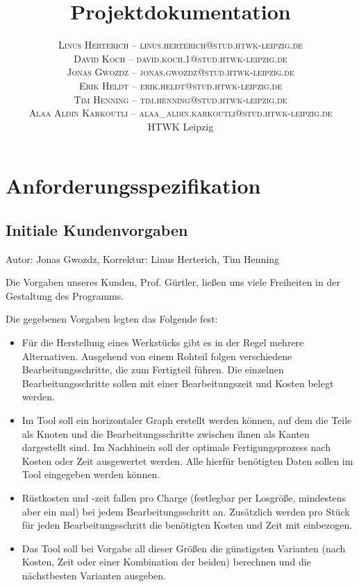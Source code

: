 \documentclass[twoside]{report}
\title{\vspace{-5mm}%
	\fontsize{24pt}{10pt}\selectfont
	\textbf{Projektdokumentation}
	}
\author{%
	\large
	\textsc{Linus Herterich -- linus.herterich@stud.htwk-leipzig.de} \\[2mm]
	\textsc{David Koch -- david.koch.1@stud.htwk-leipzig.de} \\[2mm]
	\textsc{Jonas Gwozdz -- jonas.gwozdz@stud.htwk-leipzig.de} \\[2mm]
  \textsc{Erik Heldt -- erik.heldt@stud.htwk-leipzig.de} \\[2mm]
  \textsc{Tim Henning -- tim.henning@stud.htwk-leipzig.de} \\[2mm]
	\textsc{Alaa Aldin Karkoutli -- alaa_aldin.karkoutli@stud.htwk-leipzig.de} \\[2mm]
	\normalsize	HTWK Leipzig 
	}
\date{}
\begin{document}

\maketitle
\thispagestyle{fancy}

\tableofcontents


\section{Anforderungsspezifikation}

\subsection{Initiale Kundenvorgaben}
{\small Autor: Jonas Gwozdz, Korrektur: Linus Herterich, Tim Henning}

\vspace{\baselineskip}
\noindent Die Vorgaben unseres Kunden, Prof. Gürtler, ließen uns viele Freiheiten in der Gestaltung des Programms. \par

\noindent Die gegebenen Vorgaben legten das Folgende fest: \par
\begin{itemize}
  \item Für die Herstellung eines Werkstücks gibt es in der Regel mehrere Alternativen.
  Ausgehend von einem Rohteil folgen verschiedene   Bearbeitungsschritte, die zum Fertigteil führen. 
  Die einzelnen Bearbeitungsschritte sollen mit einer Bearbeitungszeit und Kosten belegt werden. \par

  \item Im Tool soll ein horizontaler Graph erstellt werden können, auf dem die Teile als Knoten und 
  die Bearbeitungsschritte zwischen ihnen als Kanten dargestellt sind. Im Nachhinein soll der optimale 
  Fertigungsprozess nach Kosten oder Zeit ausgewertet werden. Alle hierfür benötigten Daten sollen im Tool eingegeben werden können.\par

  \item Rüstkosten und -zeit fallen pro Charge (festlegbar per Losgröße, mindestens aber ein mal) bei jedem Bearbeitungsschritt an. 
  Zusätzlich werden pro Stück für jeden Bearbeitungsschritt die benötigten Kosten und Zeit mit einbezogen. \par

  \item Das Tool soll bei Vorgabe all dieser Größen die günstigsten Varianten (nach Kosten, Zeit oder einer Kombination der beiden) 
  berechnen und die nächstbesten Varianten ausgeben.
\end{itemize}
\end{document}
